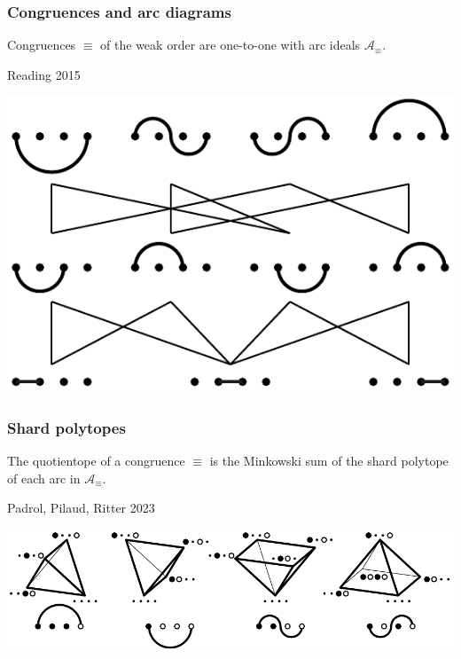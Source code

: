 \documentclass[11pt]{beamer}%
\newcommand{\red}{\color{darkred}}
\newcommand{\green}{\color{darkgreen}}
\newcommand{\auth}[1]{{\green\hfill{\footnotesize #1}}}
\renewcommand{\em }{\red}
\begin{document}
\begin{frame}
  \frametitle{Congruences and arc diagrams}
    \begin{theorem}
    Congruences $\equiv$ of the weak order are one-to-one with {\em arc ideals} $\mathcal{A}_{\equiv}$.
  \end{theorem}
  \auth{Reading 2015}
 \begin{center}
    \includegraphics[height=.5\textheight]{subarcOrder.pdf}
  \end{center}
 
\end{frame}

\begin{frame}
  \frametitle{Shard polytopes}
  \begin{theorem}
    The quotientope of a congruence $\equiv$ is the Minkowski sum of the {\em shard polytope} of each arc in $\mathcal{A}_{\equiv}$.
  \end{theorem}
  \auth{Padrol, Pilaud, Ritter 2023}
  \begin{center}
    \includegraphics[width=\textwidth]{shardPolytopes.pdf}
  \end{center}
\end{frame}
\end{document}
